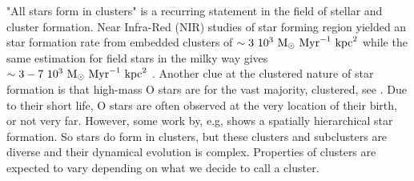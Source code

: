 "All stars form in clusters" is a recurring statement in the field of stellar and cluster formation. Near Infra-Red (NIR) studies of star forming region yielded an star formation rate from embedded clusters of $\sim 3~10^3~{\textrm{M}_\odot} ~\textrm{Myr}^{-1}~ \textrm{kpc}^2$ \citep{Lada2003} while the same estimation for field stars in the milky way gives $\sim3-7~10^3~{\textrm{M}_\odot}~\textrm{Myr}^{-1}~\textrm{kpc}^2$ \citep{Miller1979}. Another clue at the clustered nature of star formation is that high-mass O stars are for the vast majority, clustered, see \cite{DeWit2005}. Due to their short life, O stars are often observed at the very location of their birth, or not very far. However, some work by, e.g,  \cite{Gutermuth2011} shows a spatially hierarchical star formation. So stars do form in clusters, but these clusters and subclusters are diverse and their dynamical evolution is complex. Properties of clusters are expected to vary depending on what we decide to call a cluster.






%


%



